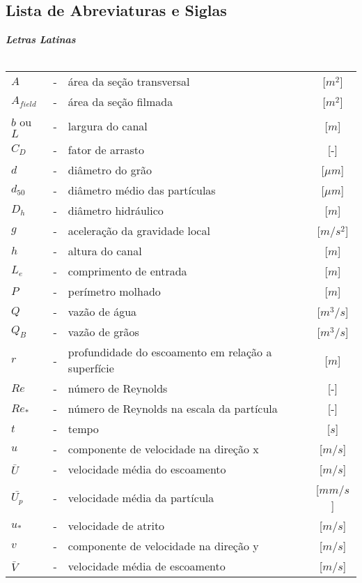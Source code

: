 \clearpage
\vspace*{1cm}
\begin{center}
	\chapter*{Lista de Abreviaturas e Siglas}
\end{center}

\vspace{1cm}
\noindent
\textbf{\emph{Letras Latinas}}\\\\
\noindent
\begin{tabular}{l c p{.6\linewidth} c }

	$A$ & - & área da seção transversal & [$m^2$]\\
	$A_{field}$ & - & área da seção filmada & [$m^2$]\\
	$b$ ou $L$  & - & largura do canal & [$m$]\\
	$C_D$ & - & fator de arrasto & [-] \\
	$d$ & - & diâmetro do grão & [$\mu m$]\\
	$d_{50}$ & - & diâmetro médio das partículas & [$\mu m$]\\
	$D_h$ & - & diâmetro hidráulico & [$m$] \\
	$g$ & - & aceleração da gravidade local & [$m/s^2$]\\
	$h$ & - & altura do canal & [$m$]\\
	$L_e$ & - & comprimento de entrada & [$m$]\\
	$P$ & - & perímetro molhado & [$m$]\\	
	$Q$ & - & vazão de água & [$m^3/s$]\\
	$Q_B$ & - & vazão de grãos & [$m^3/s$]\\
	$r$ & - & profundidade do escoamento em relação a superfície & [$m$]\\
	$Re$ & - & número de Reynolds & [-]\\
	$Re_*$ & - & número de Reynolds na escala da partícula & [-]\\
	$t$ & - & tempo & [$s$] \\
	$u$ & - & componente de velocidade na direção x & [$m/s$]\\
	$\bar{U}$ & - & velocidade média do escoamento & [$m/s$]\\
	$\bar{U_p}$ & - & velocidade média da partícula & [$mm/s$]\\
	$u_*$ & - & velocidade de atrito & [$m/s$]\\
	$v$ & - & componente de velocidade na direção y & [$m/s$]\\
	$\bar{V}$ & - & velocidade média de escoamento & [$m/s$]\\

\end{tabular}
